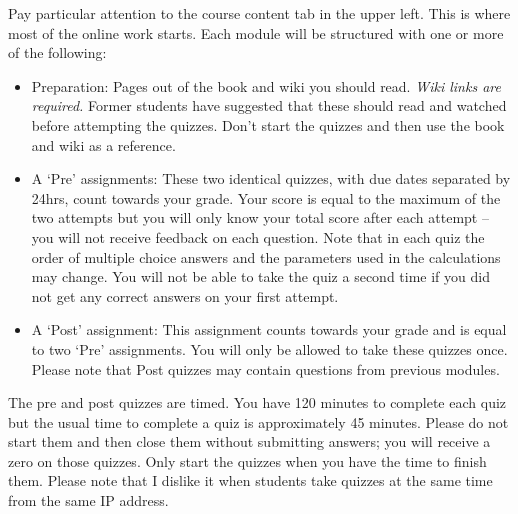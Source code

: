 \documentclass[letterpaper,10pt]{article}
\begin{document}
Pay particular attention to the course content tab in the upper
left. This is where most of the online work starts.  Each module will
be structured with one or more of the following:


\begin{itemize}
\item Preparation: Pages out of the book and wiki you should read.
  \emph{Wiki links are required.}  Former students have suggested that these should read and watched before attempting the quizzes.  Don't start the quizzes and then use the book and wiki as a reference.
  

\item A `Pre' assignments: These two identical quizzes, with due dates separated by 24hrs, count towards your grade.
  Your score is equal
  to the maximum of the two attempts but you will only know your total score after each attempt -- you will not receive feedback on each question. Note that in each quiz the order of multiple choice answers and the parameters used in the calculations may change.  You will not be able to take the quiz a second time if you did not get any correct answers on your first attempt.

\item A `Post' assignment: This assignment counts
  towards your grade and is equal to two `Pre' assignments.  You will
  only be allowed to take these quizzes once.  Please note that Post quizzes may contain questions from previous modules.

 
\end{itemize}

 The pre and post quizzes are timed. You have 120 minutes to complete each quiz but the usual time to complete a quiz is approximately 45 minutes.  Please do not start them and
  then close them without submitting answers; you will receive a zero on those quizzes.  Only start the quizzes when you have the time to
  finish them.  Please note that I dislike it when students take
  quizzes at the same time from the same IP address.




\end{document}
